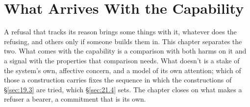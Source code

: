 \chapter{What Arrives With the Capability}
\label{sec:21}
A refusal that tracks its reason brings some things with it, whatever does the refusing, and others only if someone builds them in. This chapter separates the two. What comes with the capability is a comparison with both harms on it and a signal with the properties that comparison needs. What doesn't is a stake of the system's own, affective concern, and a model of its own attention; which of those a construction carries fixes the sequence in which the constructions of \S\ref{sec:19.3} are tried, which \S\ref{sec:21.4} sets. The chapter closes on what makes a refuser a bearer, a commitment that is its own.
